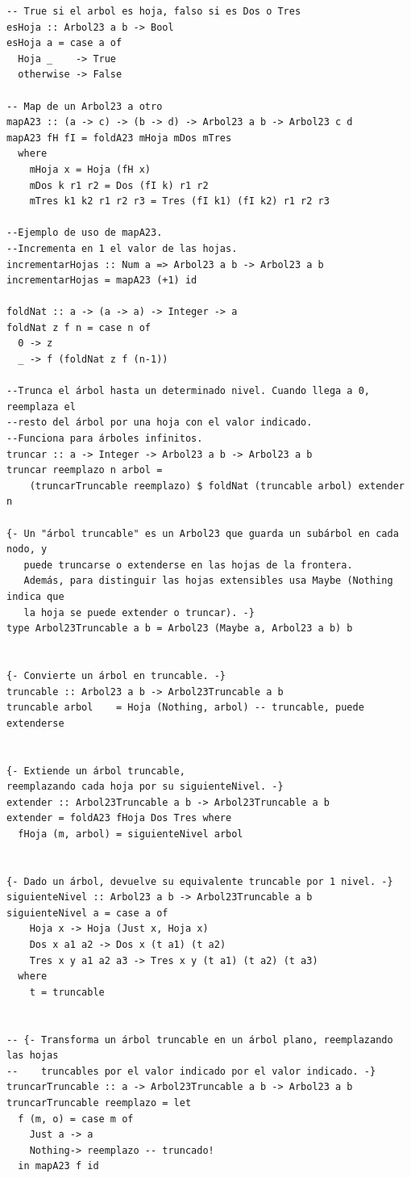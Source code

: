 \documentclass[a4paper]{article}
\begin{document}
\begin{verbatim}
-- True si el arbol es hoja, falso si es Dos o Tres
esHoja :: Arbol23 a b -> Bool
esHoja a = case a of
  Hoja _    -> True
  otherwise -> False

-- Map de un Arbol23 a otro
mapA23 :: (a -> c) -> (b -> d) -> Arbol23 a b -> Arbol23 c d
mapA23 fH fI = foldA23 mHoja mDos mTres
  where
    mHoja x = Hoja (fH x)
    mDos k r1 r2 = Dos (fI k) r1 r2
    mTres k1 k2 r1 r2 r3 = Tres (fI k1) (fI k2) r1 r2 r3

--Ejemplo de uso de mapA23.
--Incrementa en 1 el valor de las hojas.
incrementarHojas :: Num a => Arbol23 a b -> Arbol23 a b
incrementarHojas = mapA23 (+1) id

foldNat :: a -> (a -> a) -> Integer -> a
foldNat z f n = case n of
  0 -> z
  _ -> f (foldNat z f (n-1))

--Trunca el árbol hasta un determinado nivel. Cuando llega a 0, reemplaza el
--resto del árbol por una hoja con el valor indicado.
--Funciona para árboles infinitos.
truncar :: a -> Integer -> Arbol23 a b -> Arbol23 a b
truncar reemplazo n arbol =
    (truncarTruncable reemplazo) $ foldNat (truncable arbol) extender n

{- Un "árbol truncable" es un Arbol23 que guarda un subárbol en cada nodo, y
   puede truncarse o extenderse en las hojas de la frontera.
   Además, para distinguir las hojas extensibles usa Maybe (Nothing indica que
   la hoja se puede extender o truncar). -}
type Arbol23Truncable a b = Arbol23 (Maybe a, Arbol23 a b) b


{- Convierte un árbol en truncable. -}
truncable :: Arbol23 a b -> Arbol23Truncable a b
truncable arbol    = Hoja (Nothing, arbol) -- truncable, puede extenderse


{- Extiende un árbol truncable,
reemplazando cada hoja por su siguienteNivel. -}
extender :: Arbol23Truncable a b -> Arbol23Truncable a b
extender = foldA23 fHoja Dos Tres where
  fHoja (m, arbol) = siguienteNivel arbol


{- Dado un árbol, devuelve su equivalente truncable por 1 nivel. -}
siguienteNivel :: Arbol23 a b -> Arbol23Truncable a b
siguienteNivel a = case a of
    Hoja x -> Hoja (Just x, Hoja x)
    Dos x a1 a2 -> Dos x (t a1) (t a2)
    Tres x y a1 a2 a3 -> Tres x y (t a1) (t a2) (t a3)
  where
    t = truncable


-- {- Transforma un árbol truncable en un árbol plano, reemplazando las hojas
--    truncables por el valor indicado por el valor indicado. -}
truncarTruncable :: a -> Arbol23Truncable a b -> Arbol23 a b
truncarTruncable reemplazo = let
  f (m, o) = case m of
    Just a -> a
    Nothing-> reemplazo -- truncado!
  in mapA23 f id



\end{verbatim}
\end{document}

